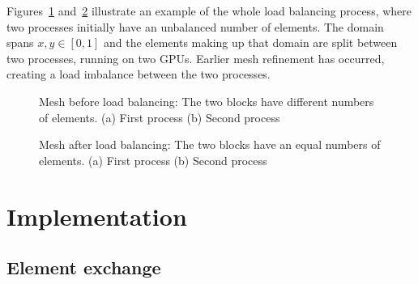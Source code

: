 Figures~\ref{fig:lb_before} and~\ref{fig:lb_after} illustrate an example of the whole load balancing
process, where two processes initially have an unbalanced number of elements. The domain spans $x, y
\in [0, 1]$ and the elements making up that domain are split between two processes, running on two
GPUs. Earlier mesh refinement has occurred, creating a load imbalance between the two processes.

\begin{figure}[H]
	\centering
	\subfloat[Process 0]
	{ \label{fig:lb_before_0}}
	\hfill
	\subfloat[Process 1]
	{ \label{fig:lb_before_1}}
	\caption{Mesh before load balancing: The two blocks have different numbers of elements. (a) First process (b) Second process}
	\label{fig:lb_before}
\end{figure}

\begin{figure}[H]
	\centering
	\subfloat[Process 0]
	{ \label{fig:lb_after_0}}
	\hfill
	\subfloat[Process 1]
	{ \label{fig:lb_after_1}}
	\caption{Mesh after load balancing: The two blocks have an equal numbers of elements. (a) First process (b) Second process}
	\label{fig:lb_after}
\end{figure}

\section{Implementation} \label{section:load_balancing:implementation}

\subsection{Element exchange} \label{subsection:load_balancing:implementation:element_exchange}
